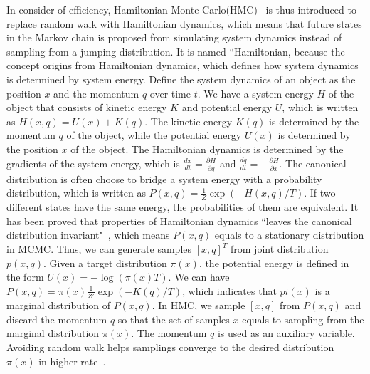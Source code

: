 \documentclass[letterpaper, 10 pt, conference]{ieeeconf}  %
\begin{document}
In consider of efficiency, Hamiltonian Monte Carlo(HMC)~\cite{N11} is thus introduced to replace random walk with Hamiltonian dynamics, which means that future states in the Markov chain is proposed from simulating system dynamics instead of sampling from a jumping distribution.
It is named ``Hamiltonian, because the concept origins from Hamiltonian dynamics, which defines how system dynamics is determined by system energy.
Define the system dynamics of an object as the position $ x $ and the momentum $ q $ over time $ t $.
We have a system energy $ H $ 
of the object that consists of kinetic energy $ K $ and potential energy $ U $, which is written as $ H(x,q) = U(x) + K(q) $.
The kinetic energy $ K(q) $ is determined by the momentum $ q $ of the object, while the potential energy $ U(x) $ is determined by the position $ x $ of the object.
The Hamiltonian dynamics is determined by the gradients of the system energy, which is
$ \frac{dx}{dt} = \frac{\partial H}{\partial q} $ and $ \frac{dq}{dt} = - \frac{\partial H}{\partial x} $.
%
The canonical distribution is often choose to bridge a system energy with a probability distribution, which is written as $ P(x, q) = \frac{1}{Z} \exp ( -H(x,q) / T ) $.
If two different states have the same energy, the probabilities of them are equivalent.
It has been proved that properties of Hamiltonian dynamics ``leaves the canonical distribution invariant"~\cite{N11}, which means $ P(x, q) $ equals to a stationary distribution in MCMC.
Thus, we can generate samples $ [ x , q ]^T $ from joint distribution $ p(x, q) $.
%
Given a target distribution $ \pi(x) $, the potential energy is defined in the form $  U(x) = - \log ( \pi(x) T ) $.
We can have $ P(x, q) = \pi(x) \frac{1}{Z'} \exp ( -K(q) / T ) $, which indicates that $ pi(x) $ is a marginal distribution of $ P(x, q) $.
In HMC, we sample $ [ x ,q ] $ from $ P(x, q) $ and discard the momentum $ q $ so that the set of samples $ x $ equals to sampling from the marginal distribution $ \pi(x) $.
The momentum $ q $ is used as an auxiliary variable.
Avoiding random walk helps samplings converge to the desired distribution $ \pi(x) $ in higher rate~\cite{N11}.
%
\end{document}
